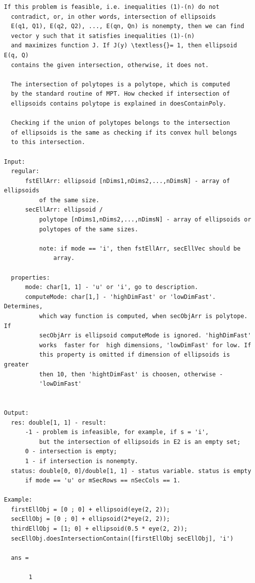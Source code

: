 \documentclass[letterpaper,10pt,english]{sphinxmanual}
\begin{document}
\begin{Verbatim}[commandchars=\\\{\}]
  If this problem is feasible, i.e. inequalities (1)-(n) do not
  contradict, or, in other words, intersection of ellipsoids
  E(q1, Q1), E(q2, Q2), ..., E(qn, Qn) is nonempty, then we can find
  vector y such that it satisfies inequalities (1)-(n)
  and maximizes function J. If J(y) \textless{}= 1, then ellipsoid E(q, Q)
  contains the given intersection, otherwise, it does not.

  The intersection of polytopes is a polytope, which is computed
  by the standard routine of MPT. How checked if intersection of
  ellipsoids contains polytope is explained in doesContainPoly.

  Checking if the union of polytopes belongs to the intersection
  of ellipsoids is the same as checking if its convex hull belongs
  to this intersection.

Input:
  regular:
      fstEllArr: ellipsoid [nDims1,nDims2,...,nDimsN] - array of ellipsoids
          of the same size.
      secEllArr: ellipsoid /
          polytope [nDims1,nDims2,...,nDimsN] - array of ellipsoids or
          polytopes of the same sizes.

          note: if mode == 'i', then fstEllArr, secEllVec should be
              array.

  properties:
      mode: char[1, 1] - 'u' or 'i', go to description.
      computeMode: char[1,] - 'highDimFast' or 'lowDimFast'. Determines,
          which way function is computed, when secObjArr is polytope. If
          secObjArr is ellipsoid computeMode is ignored. 'highDimFast'
          works  faster for  high dimensions, 'lowDimFast' for low. If
          this property is omitted if dimension of ellipsoids is greater
          then 10, then 'hightDimFast' is choosen, otherwise -
          'lowDimFast'


Output:
  res: double[1, 1] - result:
      -1 - problem is infeasible, for example, if s = 'i',
          but the intersection of ellipsoids in E2 is an empty set;
      0 - intersection is empty;
      1 - if intersection is nonempty.
  status: double[0, 0]/double[1, 1] - status variable. status is empty
      if mode == 'u' or mSecRows == nSecCols == 1.

Example:
  firstEllObj = [0 ; 0] + ellipsoid(eye(2, 2));
  secEllObj = [0 ; 0] + ellipsoid(2*eye(2, 2));
  thirdEllObj = [1; 0] + ellipsoid(0.5 * eye(2, 2));
  secEllObj.doesIntersectionContain([firstEllObj secEllObj], 'i')

  ans =

       1
\end{Verbatim}
\end{document}
